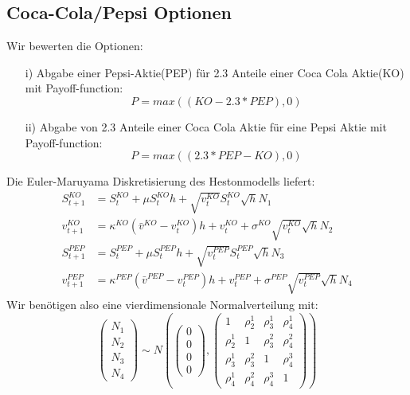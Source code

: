 \documentclass[a4paper,12pt]{article}
\numberwithin[\arabic]{Satz}{section}
\begin{document}
	\subsection*{Coca-Cola/Pepsi Optionen}
		Wir bewerten die Optionen: 
		\begin{itemize}
			\item[i)] Abgabe einer Pepsi-Aktie(PEP) für 2.3 Anteile einer Coca Cola Aktie(KO) mit Payoff-function:
				\begin{equation*}
				P=max((KO-2.3*PEP),0)
				\end{equation*}			
			\item[ii)] Abgabe von 2.3 Anteile einer Coca Cola Aktie für eine Pepsi Aktie mit Payoff-function:
			\begin{equation*}
			P=max((2.3*PEP-KO),0)
			\end{equation*}			
		\end{itemize}
		Die Euler-Maruyama Diskretisierung des Hestonmodells liefert:
		\begin{align*}
		S^{KO}_{t+1}&=S^{KO}_{t}+\mu S^{KO}_{t}h+\sqrt{v^{KO}_t}S^{KO}_{t}\sqrt{h}N_1\\
		v^{KO}_{t+1}&=\kappa^{KO}(\bar{v}^{KO}-v^{KO}_t)h+v^{KO}_t+\sigma^{KO}\sqrt{v^{KO}_t}\sqrt{h}N_2\\
		S^{PEP}_{t+1}&=S^{PEP}_{t}+\mu S^{PEP}_{t}h+\sqrt{v^{PEP}_t}S^{PEP}_{t}\sqrt{h}N_3\\
		v^{PEP}_{t+1}&=\kappa^{PEP}(\bar{v}^{PEP}-v^{PEP}_t)h+v^{PEP}_t+\sigma^{PEP}\sqrt{v^{PEP}_t}\sqrt{h}N_4
		\end{align*}
		Wir benötigen also eine vierdimensionale Normalverteilung mit:
		\begin{equation*}
		\left({\begin{array}{c} N_1\\ N_2\\ N_3\\ N_4\end{array}}\right) \sim N\left(\left({\begin{array}{c} 0 \\ 0 \\ 0 \\ 0 \end{array}}\right),\left({\begin{array}{cccc} 1 & \rho^1_2 & \rho^1_3 & \rho^1_4\\ \rho^1_2 & 1 & \rho^2_3 & \rho^2_4 \\ \rho^1_3 & \rho^2_3 & 1 & \rho^3_4 \\ \rho^1_4 & \rho^2_4 & \rho^3_4 & 1 \end{array}}\right)\right)
		\end{equation*}
\end{document}
